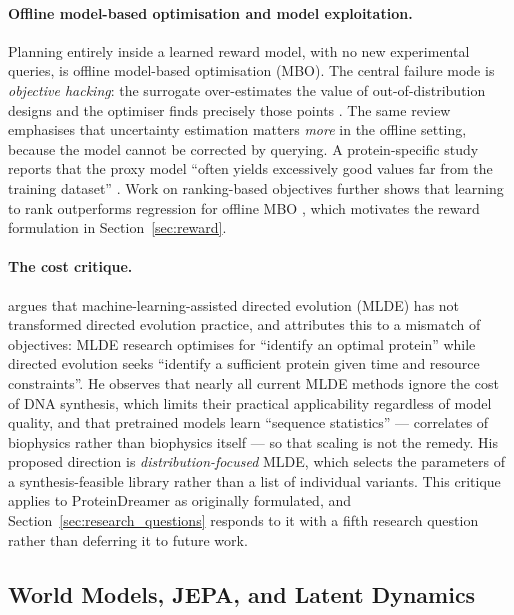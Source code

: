 \documentclass[12pt, a4paper]{article}
\begin{document}
\paragraph{Offline model-based optimisation and model exploitation.} Planning entirely inside a learned reward model, with no new experimental queries, is offline model-based optimisation (MBO). The central failure mode is \textit{objective hacking}: the surrogate over-estimates the value of out-of-distribution designs and the optimiser finds precisely those points \citep{kim2025offlinembo}. The same review emphasises that uncertainty estimation matters \textit{more} in the offline setting, because the model cannot be corrected by querying. A protein-specific study reports that the proxy model ``often yields excessively good values far from the training dataset'' \citep{safembo2025}. Work on ranking-based objectives further shows that learning to rank outperforms regression for offline MBO \citep{tan2024rank}, which motivates the reward formulation in Section~\ref{sec:reward}.

\paragraph{The cost critique.} \citet{wittmann2026retrospective} argues that machine-learning-assisted directed evolution (MLDE) has not transformed directed evolution practice, and attributes this to a mismatch of objectives: MLDE research optimises for ``identify an optimal protein'' while directed evolution seeks ``identify a sufficient protein given time and resource constraints''. He observes that nearly all current MLDE methods ignore the cost of DNA synthesis, which limits their practical applicability regardless of model quality, and that pretrained models learn ``sequence statistics'' --- correlates of biophysics rather than biophysics itself --- so that scaling is not the remedy. His proposed direction is \textit{distribution-focused} MLDE, which selects the parameters of a synthesis-feasible library rather than a list of individual variants. This critique applies to ProteinDreamer as originally formulated, and Section~\ref{sec:research_questions} responds to it with a fifth research question rather than deferring it to future work.

\subsection{World Models, JEPA, and Latent Dynamics}
\end{document}
